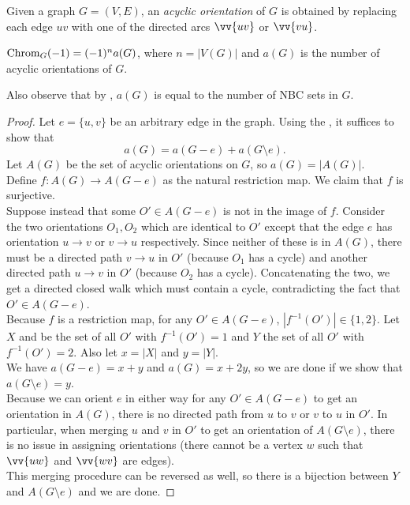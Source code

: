 	\begin{fdef}
		Given a graph $G = (V,E)$, an \emph{acyclic orientation} of $G$ is obtained by replacing each edge $uv$ with one of the directed arcs $\vv{uv}$ or $\vv{vu}$.
	\end{fdef}

	\begin{ftheo}
		$\operatorname{Chrom}_G(-1) = (-1)^n a(G)$, where $n = |V(G)|$ and $a(G)$ is the number of acyclic orientations of $G$.
	\end{ftheo}
	Also observe that by , $a(G)$ is equal to the number of NBC sets in $G$.
	\begin{proof}
		Let $e=\{u,v\}$ be an arbitrary edge in the graph. Using the , it suffices to show that
		\[ a(G) = a(G-e) + a(G\setminus e). \]
		Let $A(G)$ be the set of acyclic orientations on $G$, so $a(G) = |A(G)|$.\\
		Define $f : A(G) \to A(G-e)$ as the natural restriction map. We claim that $f$ is surjective.\\
		Suppose instead that some $O' \in A(G-e)$ is not in the image of $f$. Consider the two orientations $O_1,O_2$ which are identical to $O'$ except that the edge $e$ has orientation $u\to v$ or $v\to u$ respectively. Since neither of these is in $A(G)$, there must be a directed path $v \to u$ in $O'$ (because $O_1$ has a cycle) and another directed path $u \to v$ in $O'$ (because $O_2$ has a cycle). Concatenating the two, we get a directed closed walk which must contain a cycle, contradicting the fact that $O' \in A(G-e)$.\\
		
		Because $f$ is a restriction map, for any $O' \in A(G-e)$, $|f^{-1}(O')| \in \{1,2\}$. Let $X$ and be the set of all $O'$ with $f^{-1}(O') = 1$ and $Y$ the set of all $O'$ with $f^{-1}(O') = 2$. Also let $x = |X|$ and $y = |Y|$.\\
		We have $a(G-e) = x+y$ and $a(G) = x+2y$, so we are done if we show that $a(G\setminus e) = y$.\\

		Because we can orient $e$ in either way for any $O' \in A(G-e)$ to get an orientation in $A(G)$, there is no directed path from $u$ to $v$ or $v$ to $u$ in $O'$. In particular, when merging $u$ and $v$ in $O'$ to get an orientation of $A(G\setminus e)$, there is no issue in assigning orientations (there cannot be a vertex $w$ such that $\vv{uw}$ and $\vv{wv}$ are edges).\\
		This merging procedure can be reversed as well, so there is a bijection between $Y$ and $A(G\setminus e)$ and we are done.
	\end{proof}

